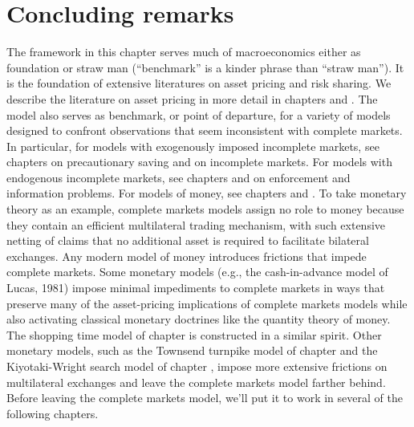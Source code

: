 \section{Concluding remarks}
  The  framework in this chapter serves much of  macroeconomics
either
as foundation or straw man (``benchmark'' is a kinder phrase than
``straw man'').
   It is the foundation of
extensive literatures on asset pricing and risk sharing.
We describe the literature on asset pricing in more
detail in chapters  and .
The model also serves as benchmark, or point of departure,
for a variety of models designed to confront observations
that seem inconsistent with complete markets. In particular,
for models   with exogenously imposed   incomplete markets,
see chapters  on precautionary saving and
 on  incomplete markets. For
models with endogenous incomplete markets,
see chapters  and  on
enforcement and information problems. For
models of money, see
chapters  and .
 To take monetary theory as an example, complete
markets models assign no role to  money because they
contain an efficient multilateral trading mechanism, with such
extensive  netting of claims that no additional asset is
required to facilitate bilateral exchanges.   Any modern model of
money introduces frictions that impede complete markets.     Some
monetary models (e.g., the cash-in-advance model of Lucas, 1981)
impose minimal impediments to complete markets in ways that  preserve many
of the asset-pricing implications of complete markets models while
also activating classical monetary doctrines like the quantity
theory of money. The shopping time model of chapter
 is constructed in a similar
spirit.  Other monetary  models, such as the Townsend turnpike
model of chapter  and the Kiyotaki-Wright search
model of chapter , impose more  extensive frictions
on multilateral exchanges and leave the complete markets model
farther behind.
  Before leaving the complete markets model, we'll put it
to work in several of the following chapters.
   

